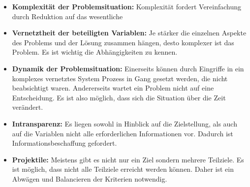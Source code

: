 \begin{itemize}
\item \textbf{Komplexität der Problemsituation:} Komplexität fordert Vereinfachung durch Reduktion auf das wesentliche 
\item \textbf{Vernetztheit der beteiligten Variablen:} Je stärker die einzelnen Aspekte des Problems und der Lösung zusammen hängen, desto komplexer ist das Problem. Es ist wichtig die Abhängigkeiten zu kennen.
\item \textbf{Dynamik der Problemsituation:} Einerseits können durch Eingriffe in ein komplexes vernetztes System Prozess in Gang gesetzt werden, die nicht beabsichtigt waren. Andererseits wartet ein Problem nicht auf eine Entscheidung. Es ist also möglich, dass sich die Situation über die Zeit verändert.
\item \textbf{Intransparenz:} Es liegen sowohl in Hinblick auf die Zielstellung, als auch auf die Variablen nicht alle erforderlichen Informationen vor. Dadurch ist Informationsbeschaffung gefordert.
\item \textbf{Projektile:} Meistens gibt es nicht nur ein Ziel sondern mehrere Teilziele. Es ist möglich, dass nicht alle Teilziele erreicht werden können. Daher ist ein Abwägen und Balancieren der Kriterien notwendig. 
\end{itemize}

